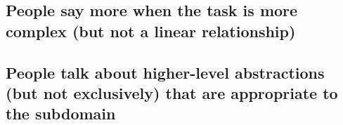 \documentclass[10pt,letterpaper]{article}
\begin{document}
\subsection{People say more when the task is more complex (but not a linear relationship)}


\subsection{People talk about higher-level abstractions (but not exclusively) that are appropriate to the subdomain}




\setlength{\bibleftmargin}{.125in}
\setlength{\bibindent}{-\bibleftmargin}


\end{document}

